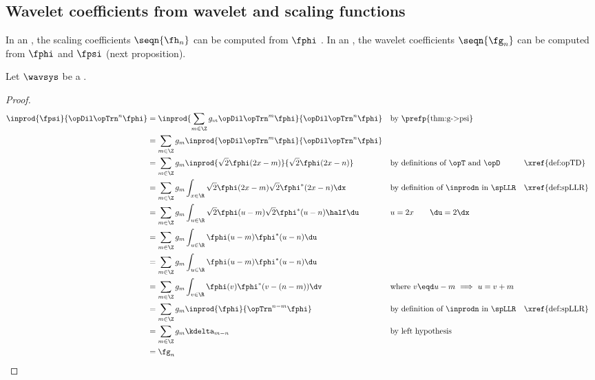 \subsection{Wavelet coefficients from wavelet and scaling functions}
In an  , the scaling coefficients $\seqn{\fh_n}$
can be computed from $\fphi$ .
In an  , the wavelet coefficients $\seqn{\fg_n}$
can be computed from $\fphi$ and $\fpsi$ (next proposition).
\begin{proposition}
\label{prop:psiphi->g}
Let $\wavsys$ be a  .
\end{proposition}
\begin{proof}
\begin{align*}
   \inprod{\fpsi}{\opDil\opTrn^n\fphi}
     &= \inprod{\sum_{m\in\Z}g_m\opDil\opTrn^m \fphi}{\opDil\opTrn^n\fphi}
     && \text{by \prefp{thm:g->psi}}
   \\&= \sum_{m\in\Z}g_m\inprod{\opDil\opTrn^m \fphi}{\opDil\opTrn^n\fphi}
   \\&= \sum_{m\in\Z}g_m \inprod{\sqrt{2}\fphi(2x-m)}{\sqrt{2}\fphi(2x-n)}
     && \text{by definitions of $\opT$ and $\opD$}
     && \text{\xref{def:opTD}}
   \\&= \sum_{m\in\Z}g_m \int_{x\in\R} \sqrt{2}\fphi(2x-m)\sqrt{2}\fphi^\ast(2x-n) \dx
     && \text{by definition of $\inprodn$ in $\spLLR$}
     && \text{\xref{def:spLLR}}
   \\&= \sum_{m\in\Z}g_m \int_{u\in\R} \sqrt{2}\fphi(u-m)\sqrt{2}\fphi^\ast(u-n) \half \du
     && u=2x\qquad \du=2\dx
   \\&= \sum_{m\in\Z}g_m \int_{u\in\R} \fphi(u-m)\fphi^\ast(u-n) \du
   \\&= \sum_{m\in\Z}g_m \int_{u\in\R} \fphi(u-m)\fphi^\ast(u-n) \du
   \\&= \sum_{m\in\Z}g_m \int_{v\in\R} \fphi(v)\fphi^\ast(v-(n-m)) \dv
     && \text{where $v\eqd u-m$ $\implies$ $u=v+m$}
   \\&= \sum_{m\in\Z}g_m \inprod{\fphi}{\opTrn^{n-m}\fphi}
     && \text{by definition of $\inprodn$ in $\spLLR$}
     && \text{\xref{def:spLLR}}
   \\&= \sum_{m\in\Z}g_m \kdelta_{m-n}
     && \text{by left hypothesis}
   \\&=\fg_n
\end{align*}
\end{proof}



